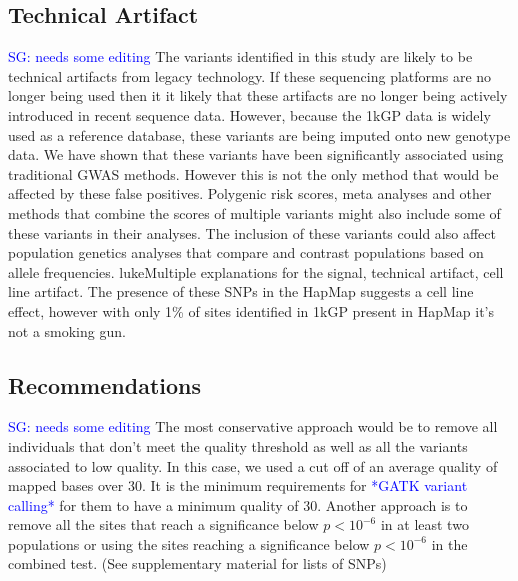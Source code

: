 \documentclass[9pt,lineno]{elife}
\newcommand{\sgcomment}[1]{\textcolor{blue}{SG: #1}}
\newcommand{\todo}[1]{\textcolor{blue}{*#1*}}
\begin{document}
\subsection{Technical Artifact}
\sgcomment{needs some editing}
The variants identified in this study are likely to be technical artifacts from legacy technology.
If these sequencing platforms are no longer being used then it it likely that these artifacts are no longer being actively introduced in recent sequence data.
However, because the 1kGP data is widely used as a reference database, these variants are being imputed onto new genotype data.
We have shown that these variants have been significantly associated using traditional GWAS methods.
However this is not the only method that would be affected by these false positives. 
Polygenic risk scores, meta analyses and other methods that combine the scores of multiple variants might also include some of these variants in their analyses.
The inclusion of these variants could also affect population genetics analyses that compare and contrast populations based on allele frequencies.
luke{Multiple explanations for the signal, technical artifact, cell line artifact. The presence of these SNPs in the HapMap suggests a cell line effect, however with only 1\% of sites identified in 1kGP present in HapMap it's not a smoking gun.}

\subsection{Recommendations}
\sgcomment{needs some editing}
The most conservative approach would be to remove all individuals that don't meet the quality threshold as well as all the variants associated to low quality.
In this case, we used a cut off of an average quality of mapped bases over 30. 
It is the minimum requirements for \todo{GATK variant calling} for them to have a minimum quality of 30.
Another approach is to remove all the sites that reach a significance below $ p < 10^{-6}$ in at least two populations or using the sites reaching a significance below $ p < 10^{-6}$ in the combined test. (See supplementary material for lists of SNPs)
\end{document}
